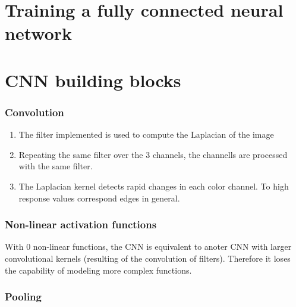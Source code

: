 \documentclass{article}
\begin{document}
\maketitle

\part{Training a fully connected neural network}


\part{CNN building blocks}

\section{Convolution}

\begin{enumerate}
	\item The filter implemented is used to compute the Laplacian of the image
	\item Repeating the same filter over the 3 channels, the channells are processed with the same filter.
	\item The Laplacian kernel detects rapid changes in each color channel. To high response values correspond edges in general.
\end{enumerate}


\section{Non-linear activation functions}


With 0 non-linear functions, the CNN is equivalent to anoter CNN with larger convolutional kernels (resulting of the convolution of filters). Therefore it loses the capability of modeling more complex functions.

\section{Pooling}
\end{document}
